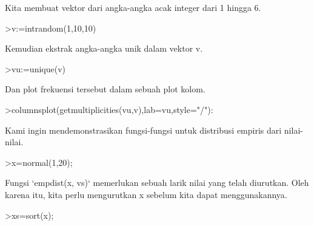 \documentclass[12pt,arial,letterpaper]{book}
\begin{document}
\begin{eulercomment}
\begin{eulercomment}
\begin{eulercomment}
\begin{eulercomment}
\begin{eulercomment}
\begin{eulercomment}
\begin{eulercomment}
\begin{eulercomment}
\begin{eulercomment}
\begin{eulercomment}
\begin{eulercomment}
\begin{eulercomment}
\begin{eulercomment}
\begin{eulercomment}
\begin{eulercomment}
\begin{eulercomment}
\begin{eulercomment}
\begin{eulercomment}
\begin{eulercomment}
\begin{eulercomment}
\begin{eulercomment}
\begin{eulercomment}
\begin{eulercomment}
\begin{eulercomment}
\begin{eulercomment}
\begin{eulercomment}
\begin{eulercomment}
\begin{eulercomment}
\begin{eulercomment}
\begin{eulercomment}
\begin{eulercomment}
\begin{eulercomment}
\begin{eulercomment}
Kita membuat vektor dari angka-angka acak integer dari 1 hingga 6.
\end{eulercomment}
\begin{eulerprompt}
>v:=intrandom(1,10,10)
\end{eulerprompt}
\begin{euleroutput}
  [4,  5,  2,  6,  1,  10,  8,  4,  1,  2]
\end{euleroutput}
\begin{eulercomment}
Kemudian ekstrak angka-angka unik dalam vektor v.
\end{eulercomment}
\begin{eulerprompt}
>vu:=unique(v)
\end{eulerprompt}
\begin{euleroutput}
  [1,  2,  4,  5,  6,  8,  10]
\end{euleroutput}
\begin{eulercomment}
Dan plot frekuensi tersebut dalam sebuah plot kolom.
\end{eulercomment}
\begin{eulerprompt}
>columnsplot(getmultiplicities(vu,v),lab=vu,style="/"):
\end{eulerprompt}
\begin{eulercomment}
Kami ingin mendemonstrasikan fungsi-fungsi untuk distribusi empiris
dari nilai-nilai.
\end{eulercomment}
\begin{eulerprompt}
>x=normal(1,20);
\end{eulerprompt}
\begin{eulercomment}
Fungsi `empdist(x, vs)` memerlukan sebuah larik nilai yang telah
diurutkan. Oleh karena itu, kita perlu mengurutkan x sebelum kita
dapat menggunakannya.
\end{eulercomment}
\begin{eulerprompt}
>xs=sort(x);
\end{eulerprompt}

\end{eulercomment}
\end{eulercomment}
\end{eulercomment}
\end{eulercomment}
\end{eulercomment}
\end{eulercomment}
\end{eulercomment}
\end{eulercomment}
\end{eulercomment}
\end{eulercomment}
\end{eulercomment}
\end{eulercomment}
\end{eulercomment}
\end{eulercomment}
\end{eulercomment}
\end{eulercomment}
\end{eulercomment}
\end{eulercomment}
\end{eulercomment}
\end{eulercomment}
\end{eulercomment}
\end{eulercomment}
\end{eulercomment}
\end{eulercomment}
\end{eulercomment}
\end{eulercomment}
\end{eulercomment}
\end{eulercomment}
\end{eulercomment}
\end{eulercomment}
\end{eulercomment}
\end{eulercomment}
\end{document}

